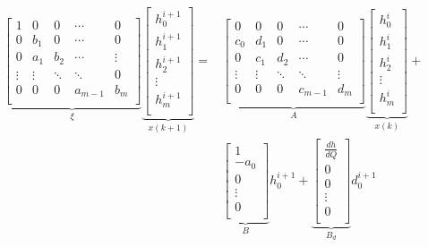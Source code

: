 \begin{equation}
\begin{aligned}
	   \underbrace{\begin{bmatrix}
	    	1 & 0    & 0    &\cdots &0\\
	    	0 & b_1  & 0    &\cdots &0\\
	    	0 &a_{1} & b_2  &\cdots &\vdots	  \\
	    \vdots&\vdots&\ddots&\ddots & 0  \\
	        0 & 0    &0  	&a_{m-1}&  b_m\\
	   \end{bmatrix}}_{\xi}
	    \underbrace{\begin{bmatrix}
		h_{0}^{i+1}\\
		h_{1}^{i+1} \\
		h_{2}^{i+1} \\			
		\vdots		\\
		h_{m}^{i+1}\\
	\end{bmatrix}}_{x(k+1)}
	=& 
	\underbrace{\begin{bmatrix}
	    	0 &  0   &   0    & \cdots   &0\\
	    c_{0} & d_1  &   0    &  \cdots  &0\\
	    0	  &c_{1} & d_2    & \cdots   &0 \\
	    \vdots&\vdots&\ddots  & \ddots   & \vdots\\
	    0	  & 0    &  0     &  c_{m-1} &  d_m\\
	    \end{bmatrix}}_{A}
	    	\underbrace{\begin{bmatrix}
		h_{0}^{i} \\
		h_{1}^{i} \\
		h_{2}^{i}\\
		\vdots		\\
		h_{m}^{i}\\
		\end{bmatrix}}_{x(k)}
	+ \\ & \underbrace{\begin{bmatrix}
		 1\\
		 -a_0 \\
		 0\\
		 \vdots \\
		 0\\
		\end{bmatrix}}_{B}
		h_0^{i+1}
		+ 
		\underbrace{\begin{bmatrix}
		 \frac{dh}{dQ}\\
		 0 \\
		 0\\
		 \vdots \\
		 0\\
		\end{bmatrix}}_{B_d}
		d_{0}^{i+1}
	\end{aligned}
\end{equation}
